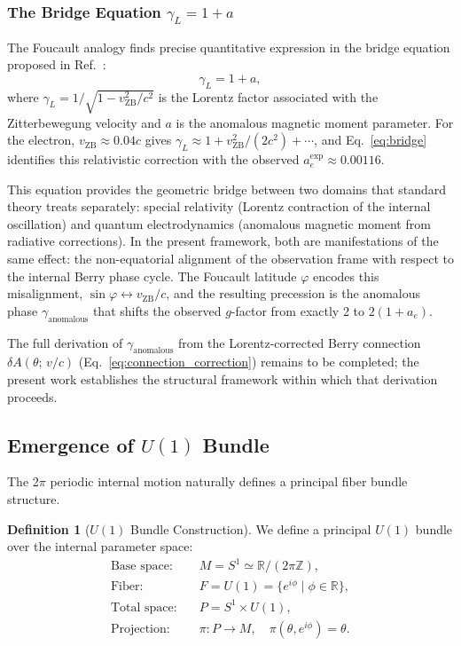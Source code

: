 \documentclass[%
 reprint,
 amsmath,amssymb,
 aps,
 prb,
]{revtex4-2}
\numberwithin{equation}{section}
\theoremstyle{definition}
\newtheorem{definition}{Definition}[section]
\theoremstyle{remark}
\newcommand{\Sone}{S^1}
\newcommand{\Uone}{U(1)}
\begin{document}
\subsubsection{The Bridge Equation $\gamma_L = 1 + a$}

The Foucault analogy finds precise quantitative expression in the bridge equation proposed in Ref.~\cite{Hanamura_2025_27}:
\begin{equation}
\gamma_L = 1 + a,
\label{eq:bridge}
\end{equation}
where $\gamma_L = 1/\sqrt{1 - v_{\text{ZB}}^2/c^2}$ is the Lorentz factor associated with the Zitterbewegung velocity and $a$ is the anomalous magnetic moment parameter. For the electron, $v_{\text{ZB}} \approx 0.04c$ gives $\gamma_L \approx 1 + v_{\text{ZB}}^2/(2c^2) + \cdots$, and Eq.~\eqref{eq:bridge} identifies this relativistic correction with the observed $a_e^{\exp} \approx 0.00116$.

This equation provides the geometric bridge between two domains that standard theory treats separately: special relativity (Lorentz contraction of the internal oscillation) and quantum electrodynamics (anomalous magnetic moment from radiative corrections). In the present framework, both are manifestations of the same effect: the non-equatorial alignment of the observation frame with respect to the internal Berry phase cycle. The Foucault latitude $\varphi$ encodes this misalignment, $\sin\varphi \leftrightarrow v_{\text{ZB}}/c$, and the resulting precession is the anomalous phase $\gamma_{\text{anomalous}}$ that shifts the observed $g$-factor from exactly 2 to $2(1+a_e)$.

The full derivation of $\gamma_{\text{anomalous}}$ from the Lorentz-corrected Berry connection $\delta A(\theta;\,v/c)$ (Eq.~\ref{eq:connection_correction}) remains to be completed; the present work establishes the structural framework within which that derivation proceeds.

\subsection{Emergence of $\Uone$ Bundle}

The 2$\pi$ periodic internal motion naturally defines a principal fiber bundle structure.

\begin{definition}[$\Uone$ Bundle Construction]
\label{def:U1_bundle}
We define a principal $\Uone$ bundle over the internal parameter space:
\begin{align}
\text{Base space:} \quad &M = \Sone \simeq \mathbb{R}/(2\pi\mathbb{Z}), \label{eq:base} \\
\text{Fiber:} \quad &F = \Uone = \{e^{i\phi} \mid \phi \in \mathbb{R}\}, \label{eq:fiber} \\
\text{Total space:} \quad &P = \Sone \times \Uone, \label{eq:total} \\
\text{Projection:} \quad &\pi: P \to M, \quad \pi(\theta, e^{i\phi}) = \theta. \label{eq:projection}
\end{align}
\end{definition}
\end{document}
